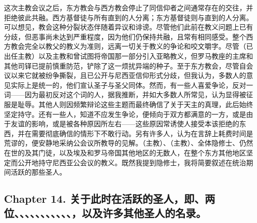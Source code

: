 这次主教会议之后，东方教会与西方教会停止了同信仰者之间通常存在的交往，并拒绝彼此共融。西方基督徒与所有直到的人分离；东方基督徒则与直到的人分离。可以想见，教会这种分裂状态伴随着异议和诽谤。尽管他们此前在教义问题上已有分歧，但恶事尚未达到严重程度，因为他们仍保持共融，且常有相同感受。整个西方教会完全以教父的教义为准则，远离一切关于教义的争论和咬文嚼字。尽管（已出任主教）以及主教和曾试图将帝国那一部分引入亚略教义，但罗马教座的主席和其他司铎已提前慎重防范，铲除了这一烦扰异端的种子。至于东方教会，尽管自会议以来它就被纷争撕裂，且已公开与尼西亚信仰形式分歧，但我认为，多数人的意见实际上是统一的，他们宣认圣子与圣父同体。然而，有一些人喜爱争论，反对一词——因为最初反对这个词的人，据我推断，并如大多数人所常见，认为显得被征服是耻辱。其他人则因频繁辩论这些主题而最终确信了关于天主的真理，此后始终坚定持守。还有一些人，知道不应发生争论，便倾向于双方都满意的一方，或是由于友谊的影响，或是被各种原因所左右——这些原因常诱使人接受本该拒绝的东西，并在需要彻底确信的情形下不敢行动。另有许多人，认为在言辞上耗费时间是荒谬的，便安静地采纳公会议所教导的见解。（主教）、（主教）、全体隐修士、仍然在世的及其门徒，以及埃及和罗马帝国其他地区的无数人，在整个东方其他地区坚定而公开地持守尼西亚公会议的教义。既然我提到隐修士，我将简要叙述在统治期间活跃的那些圣人。\par


\subsection{Chapter 14. 关于此时在活跃的圣人，即、两位、、、、、、、、、、、，以及许多其他圣人的名录。}

